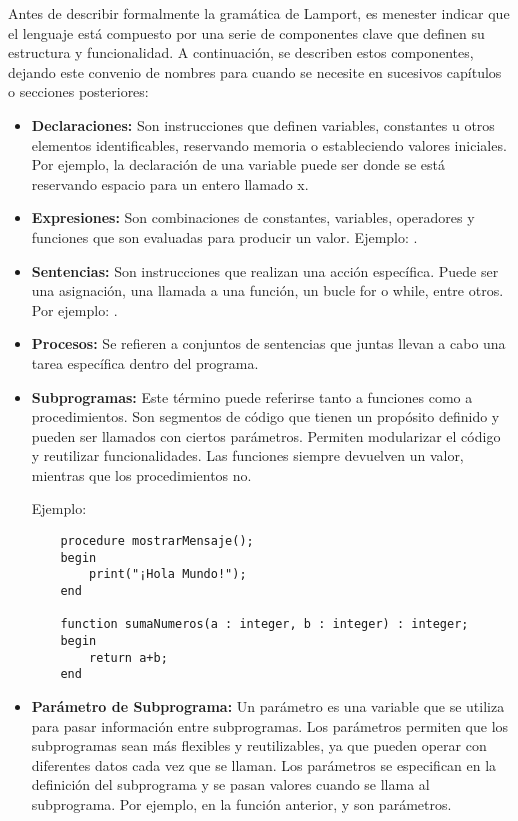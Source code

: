Antes de describir formalmente la gramática de Lamport, es menester indicar que el lenguaje está compuesto por una serie de componentes clave que definen su estructura y funcionalidad. A continuación, se describen estos componentes, dejando este convenio de nombres para cuando se necesite en sucesivos capítulos o secciones posteriores:

\begin{itemize}
    \item \textbf{Declaraciones:} Son instrucciones que definen variables, constantes u otros elementos identificables, reservando memoria o estableciendo valores iniciales. Por ejemplo, la declaración de una variable puede ser  donde se está reservando espacio para un entero llamado x.

    \item \textbf{Expresiones:} Son combinaciones de constantes, variables, operadores y funciones que son evaluadas para producir un valor. Ejemplo: .

    \item \textbf{Sentencias:} Son instrucciones que realizan una acción específica. Puede ser una asignación, una llamada a una función, un bucle for o while, entre otros. Por ejemplo: .

    \item \textbf{Procesos:} Se refieren a conjuntos de sentencias que juntas llevan a cabo una tarea específica dentro del programa. 

    \item \textbf{Subprogramas:} Este término puede referirse tanto a funciones como a procedimientos. Son segmentos de código que tienen un propósito definido y pueden ser llamados con ciertos parámetros. Permiten modularizar el código y reutilizar funcionalidades. Las funciones siempre devuelven un valor, mientras que los procedimientos no. 

    Ejemplo:
    \begin{verbatim}
    procedure mostrarMensaje();
    begin
        print("¡Hola Mundo!");
    end

    function sumaNumeros(a : integer, b : integer) : integer;
    begin
        return a+b;
    end
    \end{verbatim}

    \item \textbf{Parámetro de Subprograma:} Un parámetro es una variable que se utiliza para pasar información entre subprogramas. Los parámetros permiten que los subprogramas sean más flexibles y reutilizables, ya que pueden operar con diferentes datos cada vez que se llaman. Los parámetros se especifican en la definición del subprograma y se pasan valores cuando se llama al subprograma. Por ejemplo, en la función  anterior,  y  son parámetros.


\end{itemize}

